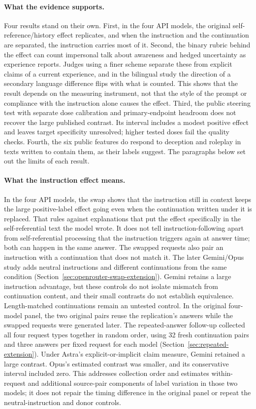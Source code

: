 \documentclass[11pt]{article}
\begin{document}
\paragraph{What the evidence supports.}
Four results stand on their own. First, in the four API models, the original
self-reference/history effect replicates, and when the instruction and the
continuation are separated, the instruction carries most of it. Second, the
binary rubric behind the effect can count impersonal talk about awareness
and hedged uncertainty as experience reports. Judges using a finer scheme
separate these from explicit claims of a current experience, and in the
bilingual study the direction of a secondary language difference flips with
what is counted. This shows that the result depends on the measuring
instrument, not that the style of the prompt or compliance with the
instruction alone causes the effect. Third, the public steering test with
separate dose calibration and primary-endpoint headroom does not recover
the large published contrast. Its interval includes a modest positive
effect and leaves target specificity unresolved; higher tested doses fail
the quality checks. Fourth, the six public features do respond to
deception and roleplay in texts written to contain them, as their labels
suggest. The paragraphs below set out the limits of each result.

\paragraph{What the instruction effect means.}
In the four API models, the swap shows that the instruction still in context
keeps the large positive-label effect going even when the continuation
written under it is replaced. That rules against explanations that put the
effect specifically in the self-referential text the model wrote. It does
not tell instruction-following apart from self-referential processing that
the instruction triggers again at answer time; both can happen in the same
answer. The swapped requests also pair an instruction with a continuation
that does not match it. The later Gemini/Opus study adds neutral instructions
and different continuations from the same condition
(Section~\ref{sec:openrouter-swap-extension}). Gemini retains a large
instruction advantage, but these controls do not isolate mismatch from
continuation content, and their small contrasts do not establish equivalence.
Length-matched continuations remain an untested control. In the original
four-model panel, the two original pairs reuse the
replication's answers while the swapped requests were generated later.
The repeated-answer follow-up collected all four request types together in
random order, using 32 fresh continuation pairs and three answers per fixed
request for each model (Section~\ref{sec:repeated-extension}). Under Astra's
explicit-or-implicit claim measure, Gemini retained a large contrast.
Opus's estimated contrast was smaller, and its conservative interval included
zero. This addresses collection order and estimates within-request and
additional source-pair components of label variation in those two models;
it does not repair the timing difference in the original panel
or repeat the neutral-instruction and donor controls.
\end{document}
